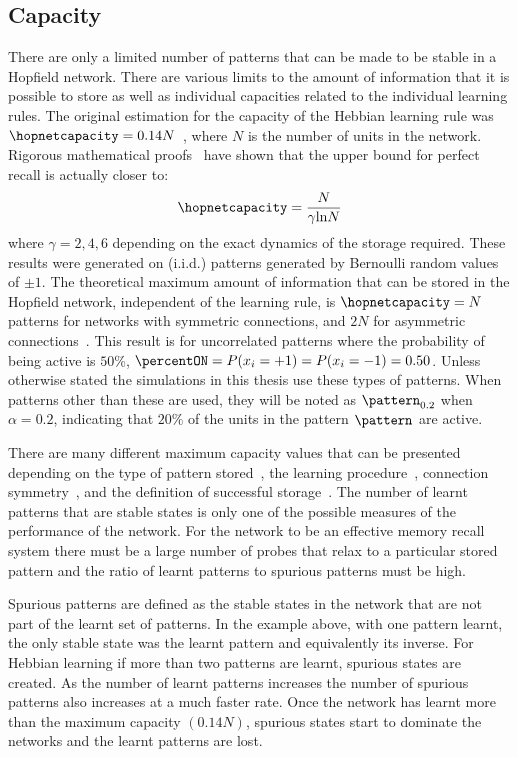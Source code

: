\subsection{Capacity}
\label{sec:capacity}
There are only a limited number of patterns that can be made to be stable in a Hopfield network.  There are various limits to the amount of information that it is possible to store as well as individual capacities related to the individual learning rules.  The original estimation for the capacity of the Hebbian learning rule was $\hopnetcapacity = 0.14N$~\citep{Amit1987}, where $N$ is the number of units in the network. Rigorous mathematical proofs~\citep{McEliece1987,Bovier1999,Lowe2005} have shown that the upper bound for perfect recall is actually closer to:
\begin{equation}
\label{eq:HopnetcapHebbian}
	\hopnetcapacity = \frac{N}{\gamma \mbox{ln} N}
\end{equation}
where $\gamma = 2,4,6$ depending on the exact dynamics of the storage required.  These results were generated on  (i.i.d.) patterns generated by Bernoulli random values of $\pm1$.  The theoretical maximum amount of information that can be stored in the Hopfield network, independent of the learning rule, is $\hopnetcapacity=N$ patterns for networks with symmetric connections, and $2N$ for asymmetric connections~\citep{Gardner1988}. This result is for uncorrelated patterns where the probability of being active is $50\%$, $\percentON=P(x_i=+1)=P(x_i=-1)=0.50$. Unless otherwise stated the simulations in this thesis use these types of patterns.  When patterns other than these are used, they will be noted as $\pattern_{0.2}$ when $\alpha=0.2$, indicating that $20\%$ of the units in the pattern $\pattern_{}$ are active.

There are many different maximum capacity values that can be presented depending on the type of pattern stored~\citep{Amit1987b}, the learning procedure~\citep{Storkey99}, connection symmetry~\citep{Chen2001}, and the definition of successful storage~\citep{Lowe2005}.  The number of learnt patterns that are stable states is only one of the possible measures of the performance of the network.  For the network to be an effective memory recall system there must be a large number of probes that relax to a particular stored pattern and the ratio of learnt patterns to spurious patterns must be high.

Spurious patterns are defined as the stable states in the network that are not part of the learnt set of patterns.  In the  example above, with one pattern learnt, the only stable state was the learnt pattern and equivalently its inverse.  For Hebbian learning if more than two patterns are learnt, spurious states are created.  As the number of learnt patterns increases the number of spurious patterns also increases at a much faster rate.  Once the network has learnt more than the maximum capacity $(0.14N)$, spurious states start to dominate the networks and the learnt patterns are lost.

